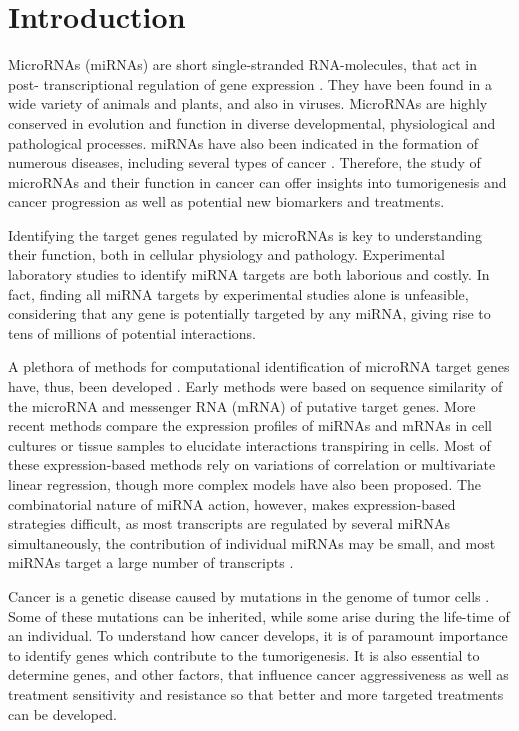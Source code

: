 
\section{Introduction}
\thispagestyle{empty}

MicroRNAs (miRNAs) are short single-stranded RNA-molecules, that act in post-
transcriptional regulation of gene expression \citep{Bartel2004}. They have
been found in a wide variety of animals and plants, and also in viruses.
MicroRNAs are highly conserved in evolution and function in diverse
developmental, physiological and pathological processes. miRNAs have also
been indicated in the formation of numerous diseases,
including several types of cancer \citep{Calin2006}. Therefore, the study of
microRNAs and their function in cancer can offer insights into tumorigenesis
and cancer progression as well as potential new biomarkers and treatments.

Identifying the target genes regulated by microRNAs is key to understanding their
function, both in cellular physiology and pathology. Experimental laboratory
studies to identify miRNA targets are both laborious and costly. In fact,
finding all miRNA targets by experimental studies alone is unfeasible, considering
that any gene is potentially targeted by any miRNA, giving rise to tens of
millions of potential interactions.

A plethora of methods for computational identification of microRNA target
genes have, thus, been developed \citep{Muniategui2013}. Early methods were based on sequence
similarity of the microRNA and messenger RNA (mRNA) of putative target genes.
More recent methods compare the expression profiles of miRNAs and mRNAs in
cell cultures or tissue samples to elucidate interactions transpiring in
cells. Most of these expression-based methods rely on variations of
correlation or multivariate linear regression, though more
complex models have also been proposed. The combinatorial nature of miRNA
action, however, makes expression-based strategies difficult, as most
transcripts are regulated by several miRNAs simultaneously, the contribution
of individual miRNAs may be small, and most miRNAs target a large number of
transcripts \citep{Baek2008}.

Cancer is a genetic disease caused by mutations in the genome of tumor cells \citep{Hanahan2000}.
Some of these mutations can be inherited, while some arise during the
life-time of an individual. To understand how cancer develops, it is of
paramount importance to identify genes which contribute to the tumorigenesis.
It is also essential to determine genes, and other factors, that influence
cancer aggressiveness as well as treatment sensitivity and resistance so that better
and more targeted treatments can be developed.

